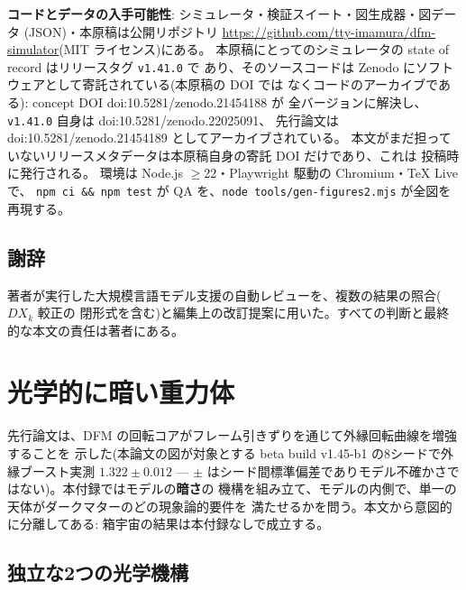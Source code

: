 \documentclass[a4paper,10pt,twocolumn]{ltjsarticle}
\begin{document}
\textbf{コードとデータの入手可能性}: シミュレータ・検証スイート・図生成器・図データ
(JSON)・本原稿は公開リポジトリ
\url{https://github.com/tty-imamura/dfm-simulator}(MIT ライセンス)にある。
本原稿にとってのシミュレータの state of record はリリースタグ \texttt{v1.41.0} で
あり、そのソースコードは Zenodo にソフトウェアとして寄託されている(本原稿の DOI では
なくコードのアーカイブである): concept DOI \mbox{doi:10.5281/zenodo.21454188} が
全バージョンに解決し、\texttt{v1.41.0} 自身は \mbox{doi:10.5281/zenodo.22025091}、
先行論文は \mbox{doi:10.5281/zenodo.21454189} としてアーカイブされている。
本文がまだ担っていないリリースメタデータは本原稿自身の寄託 DOI だけであり、これは
投稿時に発行される。
環境は Node.js $\geq$22・Playwright 駆動の Chromium・TeX Live で、
\texttt{npm ci \&\& npm test} が QA を、\texttt{node tools/gen-figures2.mjs} が全図を
再現する。

\subsection*{謝辞}
著者が実行した大規模言語モデル支援の自動レビューを、複数の結果の照合($D X_k$ 較正の
閉形式を含む)と編集上の改訂提案に用いた。すべての判断と最終的な本文の責任は著者にある。

\appendix

\section{光学的に暗い重力体}
\label{app:dark}

先行論文は、DFM の回転コアがフレーム引きずりを通じて外縁回転曲線を増強することを
示した(本論文の図が対象とする beta build v1.45-b1 の8シードで外縁ブースト実測
$1.322\pm0.012$ ---
$\pm$ はシード間標準偏差でありモデル不確かさではない)。本付録ではモデルの\textbf{暗さ}の
機構を組み立て、モデルの内側で、単一の天体がダークマターのどの現象論的要件を
満たせるかを問う。本文から意図的に分離してある: 箱宇宙の結果は本付録なしで成立する。

\subsection{独立な2つの光学機構}
\end{document}
